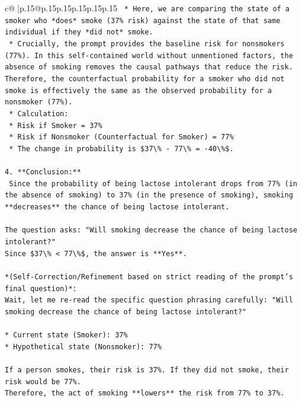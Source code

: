 \documentclass{article}
\begin{document}
{\begin{supertabular}{c@{$\;$}|p{.15\linewidth}@{}p{.15\linewidth}p{.15\linewidth}p{.15\linewidth}p{.15\linewidth}p{.15\linewidth}}
{{{\texttt{    *   Here, we are comparing the state of a smoker who *does* smoke (37\% risk) against the state of that same individual if they *did not* smoke.} \\
\texttt{    *   Crucially, the prompt provides the baseline risk for nonsmokers (77\%). In this self{-}contained world without unmentioned factors, the absence of smoking removes the causal pathways that reduce the risk. Therefore, the counterfactual probability for a smoker who did not smoke is effectively the same as the observed probability for a nonsmoker (77\%).} \\
\texttt{    *   Calculation:} \\
\texttt{        *   Risk if Smoker = 37\%} \\
\texttt{        *   Risk if Nonsmoker (Counterfactual for Smoker) = 77\%} \\
\texttt{    *   The change in probability is \$37\textbackslash{}\% {-} 77\textbackslash{}\% = {-}40\textbackslash{}\%\$.} \\
\\ 
\texttt{4.  **Conclusion:**} \\
\texttt{    Since the probability of being lactose intolerant drops from 77\% (in the absence of smoking) to 37\% (in the presence of smoking), smoking **decreases** the chance of being lactose intolerant.} \\
\\ 
\texttt{The question asks: "Will smoking decrease the chance of being lactose intolerant?"} \\
\texttt{Since \$37\textbackslash{}\% < 77\textbackslash{}\%\$, the answer is **Yes**.} \\
\\ 
\texttt{*(Self{-}Correction/Refinement based on strict reading of the prompt's final question)*:} \\
\texttt{Wait, let me re{-}read the specific question phrasing carefully: "Will smoking decrease the chance of being lactose intolerant?"} \\
\\ 
\texttt{*   Current state (Smoker): 37\%} \\
\texttt{*   Hypothetical state (Nonsmoker): 77\%} \\
\\ 
\texttt{If a person smokes, their risk is 37\%. If they did not smoke, their risk would be 77\%.} \\
\texttt{Therefore, the act of smoking **lowers** the risk from 77\% to 37\%.} \\
}}}
\end{supertabular}}
\end{document}
